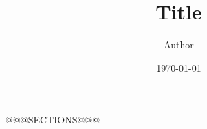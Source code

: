 \documentclass[a4paper]{article}
\begin{document}
\title{\textbf{Title}}
\author{Author}
\date{\today}
\maketitle

@@@SECTIONS@@@



\end{document}
